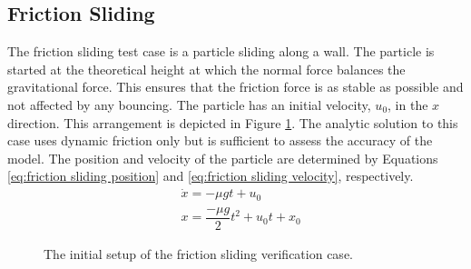 \documentclass[a4paper,11pt,titlepage]{report}
\begin{document}
\subsection{Friction Sliding}
\label{sec:friction sliding verification}
The friction sliding test case is a particle sliding along a wall. The particle is started at the theoretical height at which the normal force balances the gravitational force. This ensures that the friction force is as stable as possible and not affected by any bouncing. The particle has an initial velocity, $u_0$, in the $x$ direction. This arrangement is depicted in Figure \ref{fig:friction sliding}.
The analytic solution to this case uses dynamic friction only but is sufficient to assess the accuracy of the model. The position and velocity of the particle are determined by Equations \ref{eq:friction sliding position} and \ref{eq:friction sliding velocity}, respectively.
\begin{align}
&\dot{x} = - \mu g t + u_0 \label{eq:friction sliding velocity} \\
&x = \dfrac{- \mu g}{2}t^2 + u_0 t + x_0 \label{eq:friction sliding position}
\end{align}
\begin{figure}[!ht]
\centering

\caption{The initial setup of the friction sliding verification case.}
\label{fig:friction sliding}
\end{figure}
\end{document}

